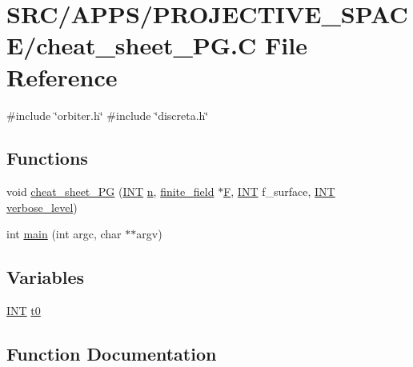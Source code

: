 \hypertarget{cheat__sheet___p_g_8_c}{}\section{S\+R\+C/\+A\+P\+P\+S/\+P\+R\+O\+J\+E\+C\+T\+I\+V\+E\+\_\+\+S\+P\+A\+C\+E/cheat\+\_\+sheet\+\_\+\+PG.C File Reference}
\label{cheat__sheet___p_g_8_c}
{\ttfamily \#include \char`\"{}orbiter.\+h\char`\"{}}\newline
{\ttfamily \#include \char`\"{}discreta.\+h\char`\"{}}\newline
\subsection*{Functions}
\begin{DoxyCompactItemize}
\item 
void \mbox{\hyperlink{cheat__sheet___p_g_8_c_a11692793a59b9f0d2f21395f5609783d}{cheat\+\_\+sheet\+\_\+\+PG}} (\mbox{\hyperlink{galois_8h_a09fddde158a3a20bd2dcadb609de11dc}{I\+NT}} \mbox{\hyperlink{simeon_8_c_a7f2cd26777ce0ff3fdaf8d02aacbddfb}{n}}, \mbox{\hyperlink{classfinite__field}{finite\+\_\+field}} $\ast$\mbox{\hyperlink{simeon_8_c_a21a61c535ff7d9d4b674461d3b19fffa}{F}}, \mbox{\hyperlink{galois_8h_a09fddde158a3a20bd2dcadb609de11dc}{I\+NT}} f\+\_\+surface, \mbox{\hyperlink{galois_8h_a09fddde158a3a20bd2dcadb609de11dc}{I\+NT}} \mbox{\hyperlink{simeon_8_c_a818073fbcc2f439e7c56952f67386122}{verbose\+\_\+level}})
\item 
int \mbox{\hyperlink{cheat__sheet___p_g_8_c_a3c04138a5bfe5d72780bb7e82a18e627}{main}} (int argc, char $\ast$$\ast$argv)
\end{DoxyCompactItemize}
\subsection*{Variables}
\begin{DoxyCompactItemize}
\item 
\mbox{\hyperlink{galois_8h_a09fddde158a3a20bd2dcadb609de11dc}{I\+NT}} \mbox{\hyperlink{cheat__sheet___p_g_8_c_a4268f4fe222ffb119218a0199f5e1904}{t0}}
\end{DoxyCompactItemize}


\subsection{Function Documentation}
\mbox{\label{cheat__sheet___p_g_8_c_a11692793a59b9f0d2f21395f5609783d}} 

